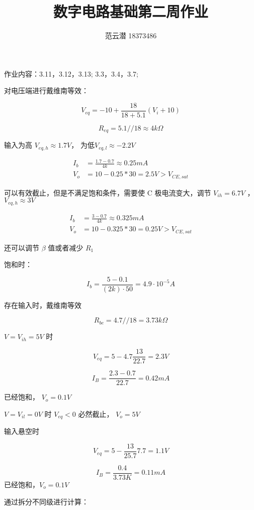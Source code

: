 \documentclass[lang=cn,11pt,a4paper,cite=authoryear]{elegantpaper}
\title{数字电路基础\quad 第二周作业}
\author{范云潜 18373486}
\institute{微电子学院 184111 班}
\date{\zhtoday}
\begin{document}
\maketitle

作业内容：3.11，3.12，3.13; 3.3，3.4，3.7;


对电压端进行戴维南等效：

\[V_{eq} = -10 + \frac{18}{18 + 5.1}(V_i + 10)\]

\[R_{eq} = 5.1 // 18 \approx 4 k\Omega\] 

输入为高 \(V_{eq,h} \approx 1.7V\)， 为低\(V_{eq,l} \approx -2.2V\)

\[\begin{aligned}
    I_b &= \frac{1.7 - 0.7}{4 k} \approx 0.25 mA \\
    V_o &= 10 - 0.25 * 30 = 2.5 V > V_{CE,sat}
\end{aligned}\]

可以有效截止，但是不满足饱和条件，需要使 C 极电流变大，调节 \(V_{ih} = 6.7 V\) ， \(V_{eq,h} \approx 3V\)

\[\begin{aligned}
    I_b &= \frac{3 - 0.7}{4 k} \approx 0.325 mA \\
    V_o &= 10 - 0.325 * 30 = 0.25 V > V_{CE,sat}
\end{aligned}\]

还可以调节 \(\beta\) 值或者减少 \(R_1\)


饱和时：

\[I_b = \frac{5-0.1}{(2k)\cdot 50} = 4.9 \cdot 10^{-5} A\]

存在输入时，戴维南等效

\[R_{be} = 4.7 // 18 = 3.73 k\Omega\]

\(V = V_{ih} = 5V\) 时 

\[V_{eq} = 5 - 4.7 \frac{13}{22.7} = 2.3V\]

\[I_B = \frac{2.3 - 0.7}{22.7} = 0.42 mA\]

已经饱和， \(V_o = 0.1 V\)

\(V = V_{il} = 0V\) 时 \(V_{eq} < 0 \) 必然截止， \(V_o = 5V\)

输入悬空时 

\[V_{eq} = 5 - \frac{13}{25.7}7.7 = 1.1 V\] 

\[I_B = \frac{0.4}{3.73 K} = 0.11 mA\] 已经饱和，\(V_o = 0.1V\)


通过拆分不同级进行计算：
\end{document}
